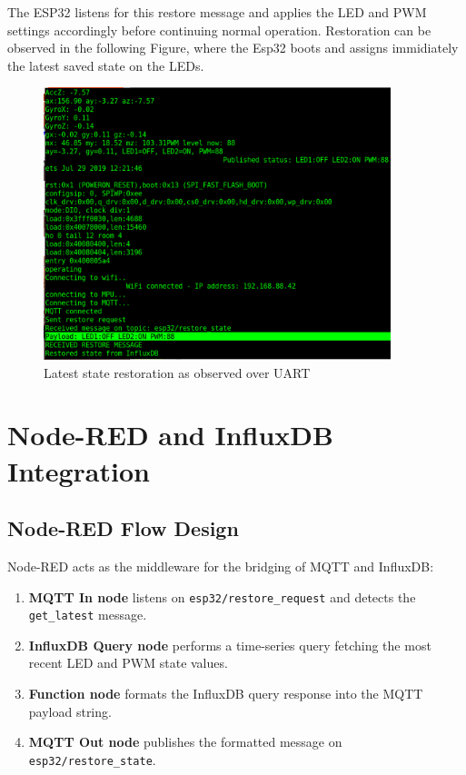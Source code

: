 \documentclass[a4paper,12pt]{article}
\begin{document}
The ESP32 listens for this restore message and 
applies the LED and PWM settings accordingly before 
continuing normal operation.
Restoration can be observed in the following Figure, where the Esp32 
boots and assigns immidiately the latest saved state on the LEDs.

		\begin{figure}[H]
			\centering
			\includegraphics[width=0.9\textwidth]{restore.png}
			\caption{Latest state restoration as observed over UART}
			\label{fig1:}
		\end{figure}		



\section{Node-RED and InfluxDB Integration}

\subsection{Node-RED Flow Design}

Node-RED acts as the middleware for the bridging of MQTT and InfluxDB:

\begin{enumerate}
    \item \textbf{MQTT In node} listens on \texttt{esp32/restore\_request} and 
	    detects the \texttt{get\_latest} message.
    \item \textbf{InfluxDB Query node} performs a time-series query 
	    fetching the most recent LED and PWM state values.
    \item \textbf{Function node} formats the InfluxDB query response 
	    into the MQTT payload string.
    \item \textbf{MQTT Out node} publishes the 
	    formatted message on \texttt{esp32/restore\_state}.
\end{enumerate}
\end{document}
